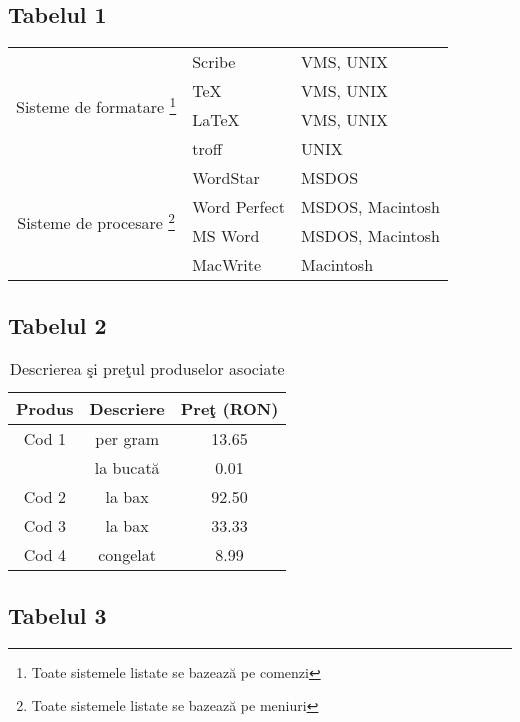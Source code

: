\documentclass{article}
\begin{document}
\subsection*{Tabelul 1}

\begin{minipage}{\textwidth}
	\begin{center}
		\begin{tabular}{|c|l|l|}
		\hline
			\multirow{4}{*}{Sisteme de formatare \footnote{Toate sistemele listate se bazează pe comenzi}}&Scribe & VMS, UNIX\\
			& \TeX & VMS, UNIX\\
			& \LaTeX & VMS, UNIX\\
			& troff & UNIX\\
		\hline
			\multirow{4}{*}{Sisteme de procesare \footnote{Toate sistemele listate se bazează pe meniuri}}&WordStar & MSDOS\\
			& Word Perfect & MSDOS, Macintosh\\
			& MS Word & MSDOS, Macintosh\\
			& MacWrite & Macintosh\\
		\hline
		\end{tabular}
	\end{center}
\end{minipage}

\renewcommand{\tablename}{Tabelul}

\subsection*{Tabelul 2}

\begin{table}[htbp]
	\centering
	\begin{tabular}{c c c}
		\textbf{Produs} & \textbf{Descriere} & \textbf{Preţ (RON)} \\
		\hline
		Cod 1 & per gram & 13.65 \\
		& la bucată & 0.01 \\
		Cod 2 & la bax & 92.50 \\
		Cod 3 & la bax & 33.33 \\
		Cod 4 & congelat & 8.99 \\
		\hline
	\end{tabular}
	\caption{Descrierea şi preţul produselor asociate}
\end{table}

\subsection*{Tabelul 3}
\end{document}
